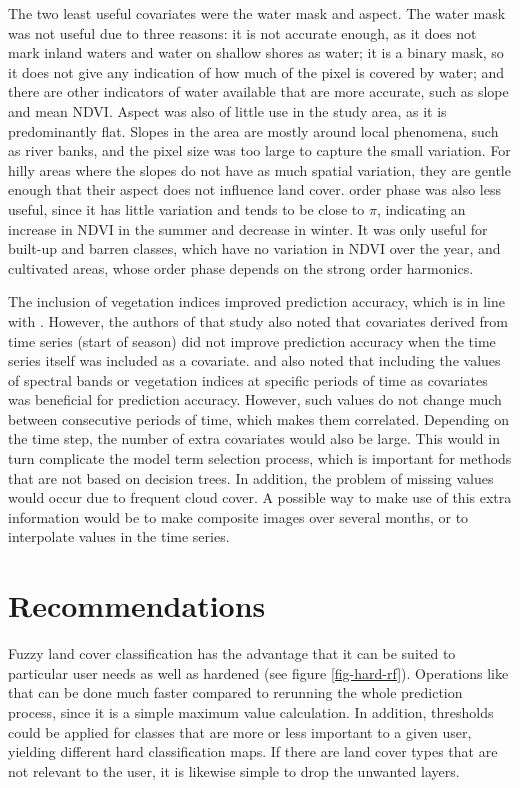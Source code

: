 \documentclass[a4paper,12pt]{scrbook}
\begin{document}
The two least useful covariates were the water mask and aspect. The water mask was not useful due to three reasons: it is not accurate enough, as it does not mark inland waters and water on shallow shores as water; it is a binary mask, so it does not give any indication of how much of the pixel is covered by water; and there are other indicators of water available that are more accurate, such as slope and mean NDVI. Aspect was also of little use in the study area, as it is predominantly flat. Slopes in the area are mostly around local phenomena, such as river banks, and the pixel size was too large to capture the small variation. For hilly areas where the slopes do not have as much spatial variation, they are gentle enough that their aspect does not influence land cover.  order phase was also less useful, since it has little variation and tends to be close to $\pi{}$, indicating an increase in NDVI in the summer and decrease in winter. It was only useful for built-up and barren classes, which have no variation in NDVI over the year, and cultivated areas, whose  order phase depends on the strong  order harmonics.

The inclusion of vegetation indices improved prediction accuracy, which is in line with \citet{Pelletier2016hardrf}. However, the authors of that study also noted that covariates derived from time series (start of season) did not improve prediction accuracy when the time series itself was included as a covariate. \citet{davranche2010wetland} and \citet{dong2014lswi} also noted that including the values of spectral bands or vegetation indices at specific periods of time as covariates was beneficial for prediction accuracy. However, such values do not change much between consecutive periods of time, which makes them correlated. Depending on the time step, the number of extra covariates would also be large. This would in turn complicate the model term selection process, which is important for methods that are not based on decision trees. In addition, the problem of missing values would occur due to frequent cloud cover. A possible way to make use of this extra information would be to make composite images over several months, or to interpolate values in the time series.

\section{Recommendations}

Fuzzy land cover classification has the advantage that it can be suited to particular user needs as well as hardened (see figure \ref{fig-hard-rf}). Operations like that can be done much faster compared to rerunning the whole prediction process, since it is a simple maximum value calculation. In addition, thresholds could be applied for classes that are more or less important to a given user, yielding different hard classification maps. If there are land cover types that are not relevant to the user, it is likewise simple to drop the unwanted layers.
\end{document}
